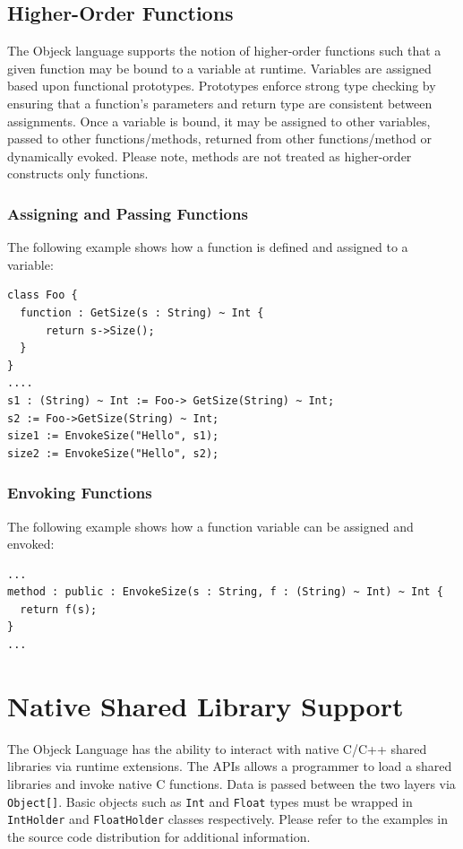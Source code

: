 \documentclass[11pt]{article}
\begin{document}
\subsection{Higher-Order Functions}
The Objeck language supports the notion of higher-order functions such
that a given function may be bound to a variable at runtime.
Variables are assigned based upon functional prototypes.  Prototypes
enforce strong type checking by ensuring that a function's parameters
and return type are consistent between assignments.  Once a variable
is bound, it may be assigned to other variables, passed to other
functions/methods, returned from other functions/method or dynamically
evoked.  Please note, methods are not treated as higher-order
constructs only functions.

\subsubsection{Assigning and Passing Functions}
The following example shows how a function is defined and assigned to
a variable:
\begin{verbatim}
class Foo {
  function : GetSize(s : String) ~ Int {
      return s->Size();
  }
}
....
s1 : (String) ~ Int := Foo-> GetSize(String) ~ Int;
s2 := Foo->GetSize(String) ~ Int;
size1 := EnvokeSize("Hello", s1);
size2 := EnvokeSize("Hello", s2);
\end{verbatim}

\subsubsection{Envoking Functions}
The following example shows how a function variable can be assigned
and envoked:
\begin{verbatim}
...
method : public : EnvokeSize(s : String, f : (String) ~ Int) ~ Int {
  return f(s);
}
...
\end{verbatim}

\section{Native Shared Library Support}
The Objeck Language has the ability to interact with native C/C++
shared libraries via runtime extensions.  The APIs allows a programmer
to load a shared libraries and invoke native C functions.  Data is
passed between the two layers via \texttt{Object[]}.  Basic objects
such as \texttt{Int} and \texttt{Float} types must be wrapped in
\texttt{IntHolder} and \texttt{FloatHolder} classes respectively.
Please refer to the examples in the source code distribution for
additional information.
\end{document}
